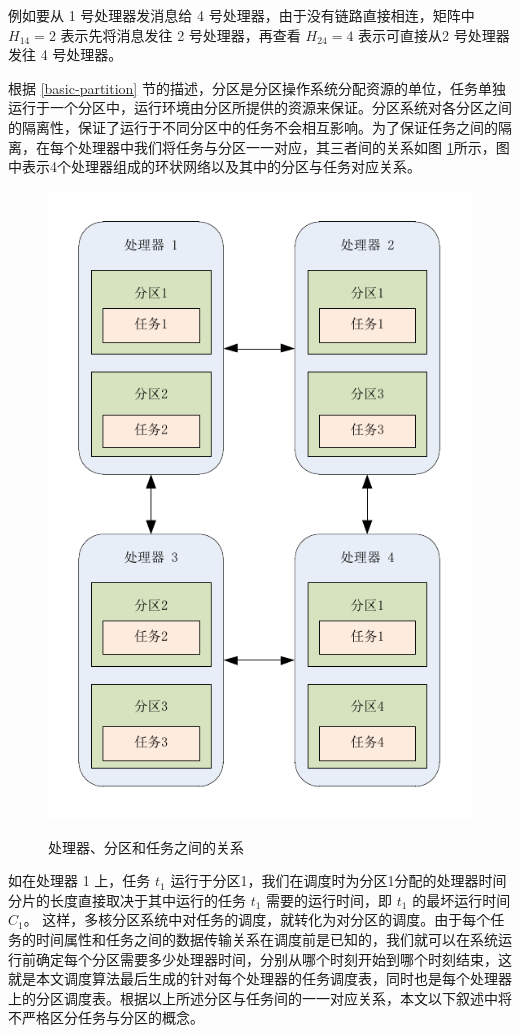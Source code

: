 例如要从 1 号处理器发消息给 4 号处理器，由于没有链路直接相连，矩阵中 $H_{14}=2$ 表示先将消息发往 2 号处理器，再查看 $H_{24}=4$ 表示可直接从2 号处理器发往 4 号处理器。


根据 \ref{basic-partition} 节的描述，分区是分区操作系统分配资源的单位，任务单独运行于一个分区中，运行环境由分区所提供的资源来保证。分区系统对各分区之间的隔离性，保证了运行于不同分区中的任务不会相互影响。为了保证任务之间的隔离，在每个处理器中我们将任务与分区一一对应，其三者间的关系如图 \ref{DLS-fig-task-partition-relation}所示，图中表示4个处理器组成的环状网络以及其中的分区与任务对应关系。

\begin{figure}[!hbt]
  \centering
  \includegraphics[height=60ex]{figure/DLS-task-partition-relation.pdf}\\
  \caption{处理器、分区和任务之间的关系}\label{DLS-fig-task-partition-relation}
\end{figure}

如在处理器 1 上，任务 $t_1$ 运行于分区1，我们在调度时为分区1分配的处理器时间分片的长度直接取决于其中运行的任务 $t_1$ 需要的运行时间，即 $t_1$ 的最坏运行时间 $C_1$。 这样，多核分区系统中对任务的调度，就转化为对分区的调度。由于每个任务的时间属性和任务之间的数据传输关系在调度前是已知的，我们就可以在系统运行前确定每个分区需要多少处理器时间，分别从哪个时刻开始到哪个时刻结束，这就是本文调度算法最后生成的针对每个处理器的任务调度表，同时也是每个处理器上的分区调度表。根据以上所述分区与任务间的一一对应关系，本文以下叙述中将不严格区分任务与分区的概念。


